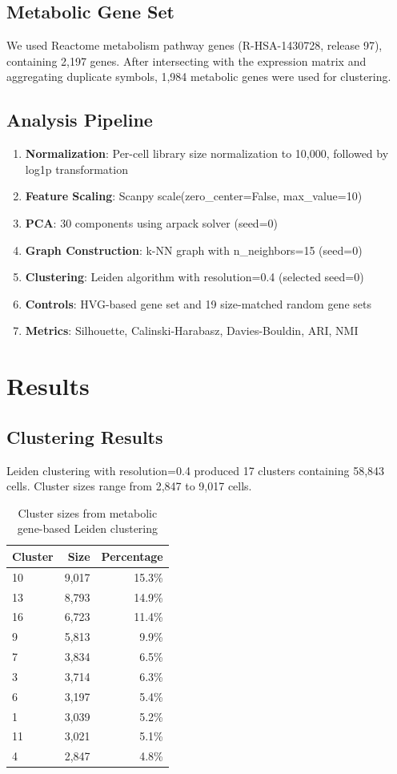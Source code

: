 \documentclass[12pt, a4paper]{article}
\begin{document}
\subsection{Metabolic Gene Set}
We used Reactome metabolism pathway genes (R-HSA-1430728, release 97), containing 2,197 genes. After intersecting with the expression matrix and aggregating duplicate symbols, 1,984 metabolic genes were used for clustering.

\subsection{Analysis Pipeline}
\begin{enumerate}
    \item \textbf{Normalization}: Per-cell library size normalization to 10,000, followed by log1p transformation
    \item \textbf{Feature Scaling}: Scanpy scale(zero_center=False, max_value=10)
    \item \textbf{PCA}: 30 components using arpack solver (seed=0)
    \item \textbf{Graph Construction}: k-NN graph with n_neighbors=15 (seed=0)
    \item \textbf{Clustering}: Leiden algorithm with resolution=0.4 (selected seed=0)
    \item \textbf{Controls}: HVG-based gene set and 19 size-matched random gene sets
    \item \textbf{Metrics}: Silhouette, Calinski-Harabasz, Davies-Bouldin, ARI, NMI
\end{enumerate}

\section{Results}

\subsection{Clustering Results}
Leiden clustering with resolution=0.4 produced 17 clusters containing 58,843 cells. Cluster sizes range from 2,847 to 9,017 cells.

\begin{table}[h!]
\centering
\caption{Cluster sizes from metabolic gene-based Leiden clustering}
\begin{tabular}{lrr}
\toprule
Cluster & Size & Percentage \\
\midrule
10 & 9,017 & 15.3\% \\
13 & 8,793 & 14.9\% \\
16 & 6,723 & 11.4\% \\
9 & 5,813 & 9.9\% \\
7 & 3,834 & 6.5\% \\
3 & 3,714 & 6.3\% \\
6 & 3,197 & 5.4\% \\
1 & 3,039 & 5.2\% \\
11 & 3,021 & 5.1\% \\
4 & 2,847 & 4.8\% \\
\bottomrule
\end{tabular}
\end{table}
\end{document}
